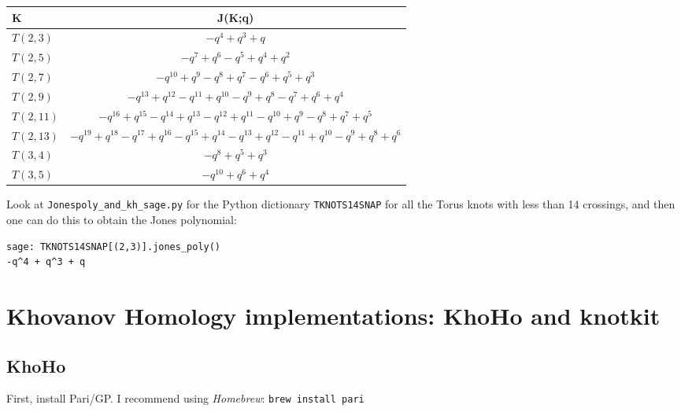 \documentclass[10pt]{amsart}
\begin{document}
\begin{multicols*}{2}
\begin{center}
\begin{tabular}{l c}
  K & J(K;q) \\ \hline 
  $T(2,3)$ & $-q^{4} + q^{3} + q$ \\
  $T(2,5)$ & $-q^{7} + q^{6} - q^{5} + q^{4} + q^{2}$ \\
  $T(2,7)$ & $-q^{10} + q^{9} - q^{8} + q^{7} - q^{6} + q^{5} + q^{3}$ \\
  $T(2,9)$ & $-q^{13} + q^{12} - q^{11} + q^{10} - q^{9} + q^{8} - q^{7} + q^{6} + q^{4}$  \\
  $T(2,11)$ & $-q^{16} + q^{15} - q^{14} + q^{13} - q^{12} + q^{11} - q^{10} + q^{9} - q^{8} + q^{7} + q^{5}$ \\
  $T(2,13)$ & $-q^{19} + q^{18} - q^{17} + q^{16} - q^{15} + q^{14} - q^{13} + q^{12} - q^{11} + q^{10} - q^{9} + q^{8} + q^{6}$ \\
  $T(3,4)$ & $-q^{8} + q^{5} + q^{3}$ \\
  $T(3,5)$ & $-q^{10} + q^{6} + q^{4}$ 
\end{tabular}
\label{table:JonespolysSnapPy}
\end{center}
Look at \verb|Jonespoly_and_kh_sage.py| for the Python dictionary \verb|TKNOTS14SNAP| for all the Torus knots with less than 14 crossings, and then one can do this to obtain the Jones polynomial:
\begin{lstlisting}
sage: TKNOTS14SNAP[(2,3)].jones_poly()
-q^4 + q^3 + q
\end{lstlisting} 

\section{Khovanov Homology implementations: KhoHo and knotkit}

\subsection{KhoHo}

First, install Pari/GP.  I recommend using \emph{Homebrew}: \verb|brew install pari|


\end{multicols*}
\end{document}
